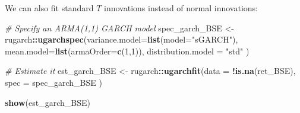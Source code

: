 \documentclass[11pt,]{article}
\newenvironment{Shaded}{\begin{snugshade}}{\end{snugshade}}
\newcommand{\KeywordTok}[1]{\textcolor[rgb]{0.13,0.29,0.53}{\textbf{#1}}}
\newcommand{\DataTypeTok}[1]{\textcolor[rgb]{0.13,0.29,0.53}{#1}}
\newcommand{\DecValTok}[1]{\textcolor[rgb]{0.00,0.00,0.81}{#1}}
\newcommand{\StringTok}[1]{\textcolor[rgb]{0.31,0.60,0.02}{#1}}
\newcommand{\CommentTok}[1]{\textcolor[rgb]{0.56,0.35,0.01}{\textit{#1}}}
\newcommand{\OperatorTok}[1]{\textcolor[rgb]{0.81,0.36,0.00}{\textbf{#1}}}
\newcommand{\NormalTok}[1]{#1}
\begin{document}
We can also fit standard \(T\) innovations instead of normal
innovations:

\begin{Shaded}
\begin{Highlighting}[]
\CommentTok{# Specify an ARMA(1,1) GARCH model}
\NormalTok{spec_garch_BSE <-}\StringTok{ }\NormalTok{rugarch}\OperatorTok{::}\KeywordTok{ugarchspec}\NormalTok{(}\DataTypeTok{variance.model=}\KeywordTok{list}\NormalTok{(}\DataTypeTok{model=}\StringTok{"sGARCH"}\NormalTok{),}
                                      \DataTypeTok{mean.model=}\KeywordTok{list}\NormalTok{(}\DataTypeTok{armaOrder=}\KeywordTok{c}\NormalTok{(}\DecValTok{1}\NormalTok{,}\DecValTok{1}\NormalTok{)),}
                                      \DataTypeTok{distribution.model =} \StringTok{"std"}
\NormalTok{                                      )}

\CommentTok{# Estimate it}
\NormalTok{est_garch_BSE <-}\StringTok{ }\NormalTok{rugarch}\OperatorTok{::}\KeywordTok{ugarchfit}\NormalTok{(}\DataTypeTok{data =} \OperatorTok{!}\KeywordTok{is.na}\NormalTok{(ret_BSE),}
                                    \DataTypeTok{spec =}\NormalTok{ spec_garch_BSE}
\NormalTok{                                    )}

\KeywordTok{show}\NormalTok{(est_garch_BSE)}
\end{Highlighting}
\end{Shaded}
\end{document}

